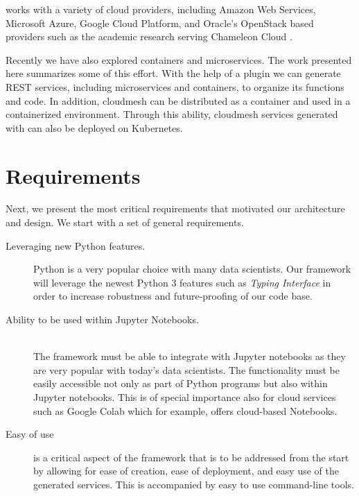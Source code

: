 {\Cloudmesh works with a variety of cloud providers, including Amazon Web
Services, Microsoft Azure, Google Cloud Platform, and Oracle's
OpenStack based providers such as the academic research serving
Chameleon Cloud .

Recently we have also explored containers and microservices. The work
presented here summarizes some of this effort. With the help of a
plugin  we can generate REST
services, including microservices and containers, to organize its
functions and code. In addition, cloudmesh can be distributed as a
container and used in a containerized environment. Through this
ability, cloudmesh services generated with  can also be deployed on Kubernetes.
}

\section{Requirements}
\label{sec:requirements}

Next, we present the most critical requirements that motivated our
architecture and design. We start with a set of general requirements.

\begin{description}

\item[Leveraging new Python features.] Python is a very popular choice
with many data scientists. Our framework will leverage the newest
Python 3 features such as {\em Typing
Interface} \cite{www-python-typing} in order to increase robustness
and future-proofing of our code base.   

\item[Ability to be used within Jupyter Notebooks.] ~\\
The framework must be able to integrate with Jupyter notebooks as they
are very popular with today's data scientists. The functionality must
be easily accessible not only as part of Python programs but also
within Jupyter notebooks. This is of special importance also for cloud
services such as Google Colab \cite{google-colab} which for example,
offers cloud-based Notebooks.

\item[Easy of use] is a critical aspect of the framework that is to be
addressed from the start by allowing for ease of creation, ease of
deployment, and easy use of the generated services. This is
accompanied by easy to use command-line tools. 

\end{description}

